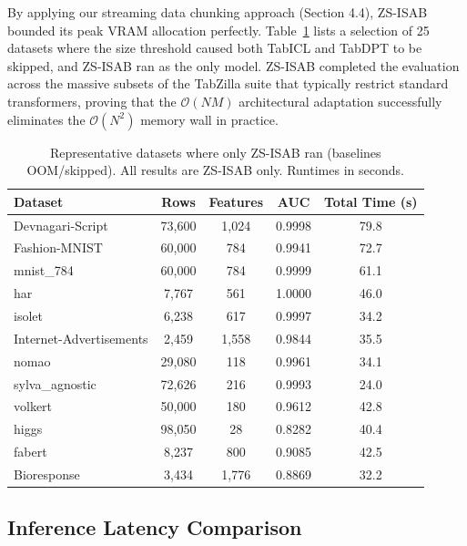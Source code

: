 \documentclass{article}
\begin{document}
By applying our streaming data chunking approach (Section 4.4), ZS-ISAB bounded its peak VRAM allocation perfectly. Table~\ref{tab:oom_datasets} lists a selection of 25 datasets where the size threshold caused both TabICL and TabDPT to be skipped, and ZS-ISAB ran as the only model. ZS-ISAB completed the evaluation across the massive subsets of the TabZilla suite that typically restrict standard transformers, proving that the $\mathcal{O}(NM)$ architectural adaptation successfully eliminates the $\mathcal{O}(N^2)$ memory wall in practice.

\begin{table}[htbp]
\centering
\caption{Representative datasets where only ZS-ISAB ran (baselines OOM/skipped). All results are ZS-ISAB only. Runtimes in seconds.}
\label{tab:oom_datasets}
\small
\begin{tabular}{@{}lcccc@{}}
\toprule
\textbf{Dataset} & \textbf{Rows} & \textbf{Features} & \textbf{AUC} & \textbf{Total Time (s)} \\
\midrule
Devnagari-Script  & 73,600 & 1,024 & 0.9998 & 79.8 \\
Fashion-MNIST     & 60,000 & 784   & 0.9941 & 72.7 \\
mnist\_784        & 60,000 & 784   & 0.9999 & 61.1 \\
har               & 7,767  & 561   & 1.0000 & 46.0 \\
isolet            & 6,238  & 617   & 0.9997 & 34.2 \\
Internet-Advertisements & 2,459 & 1,558 & 0.9844 & 35.5 \\
nomao             & 29,080 & 118   & 0.9961 & 34.1 \\
sylva\_agnostic   & 72,626 & 216   & 0.9993 & 24.0 \\
volkert           & 50,000 & 180   & 0.9612 & 42.8 \\
higgs             & 98,050 & 28    & 0.8282 & 40.4 \\
fabert            & 8,237  & 800   & 0.9085 & 42.5 \\
Bioresponse       & 3,434  & 1,776 & 0.8869 & 32.2 \\
\bottomrule
\end{tabular}
\end{table}

\subsection{Inference Latency Comparison}
\end{document}
